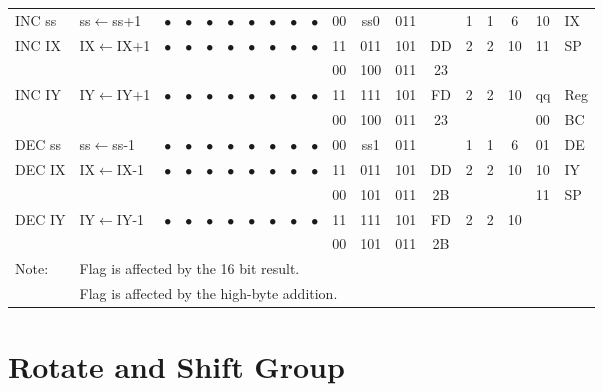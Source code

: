 \documentclass[oneside,a4paper]{book}
\begin{document}
{\begin{tabular}{llc@{ }c@{ }c@{ }c@{ }c@{ }c@{ }c@{ }cc@{ }c@{ }cccccll}
INC ss & ss$\leftarrow$ss+1 &
	$\bullet$ & $\bullet$ & $\bullet$ & $\bullet$ & $\bullet$ & $\bullet$ & $\bullet$ & $\bullet$ & 00 & ss0 & 011
	&  & 1 & 1 & 6 & 10 & IX \\

INC IX & IX$\leftarrow$IX+1 &
	$\bullet$ & $\bullet$ & $\bullet$ & $\bullet$ & $\bullet$ & $\bullet$ & $\bullet$ & $\bullet$ & 11 & 011 & 101
	& DD & 2 & 2 & 10 & 11 & SP \\
\multicolumn{10}{c}{} & 00 & 100 & 011 & 23 & \multicolumn{3}{c}{} & & \\

INC IY & IY$\leftarrow$IY+1 &
	$\bullet$ & $\bullet$ & $\bullet$ & $\bullet$ & $\bullet$ & $\bullet$ & $\bullet$ & $\bullet$ & 11 & 111 & 101
	& FD & 2 & 2 & 10 & qq & Reg \\ \cline{18-19}
\multicolumn{10}{c}{} & 00 & 100 & 011 & 23 & \multicolumn{3}{c}{} & 00 & BC \\

DEC ss & ss$\leftarrow$ss-1 &
	$\bullet$ & $\bullet$ & $\bullet$ & $\bullet$ & $\bullet$ & $\bullet$ & $\bullet$ & $\bullet$ & 00 & ss1 & 011
	&  & 1 & 1 & 6 & 01 & DE \\

DEC IX & IX$\leftarrow$IX-1 &
	$\bullet$ & $\bullet$ & $\bullet$ & $\bullet$ & $\bullet$ & $\bullet$ & $\bullet$ & $\bullet$ & 11 & 011 & 101
	& DD & 2 & 2 & 10 & 10 & IY \\
\multicolumn{10}{c}{} & 00 & 101 & 011 & 2B & \multicolumn{3}{c}{} & 11 & SP \\

DEC IY & IY$\leftarrow$IY-1 &
	$\bullet$ & $\bullet$ & $\bullet$ & $\bullet$ & $\bullet$ & $\bullet$ & $\bullet$ & $\bullet$ & 11 & 111 & 101
	& FD & 2 & 2 & 10 & & \\
\multicolumn{10}{c}{} & 00 & 101 & 011 & 2B & \multicolumn{3}{c}{} & & \\ \hline

Note: & \multicolumn{18}{l}{\parbox{12cm}{\footnotemark[1]Flag is affected by the 16 bit result.}} \\
      & \multicolumn{18}{l}{\parbox{12cm}{\footnotemark[2]Flag is affected by the high-byte addition.}} \\ \hline

\end{tabular}
}

\section{Rotate and Shift Group}
\end{document}

